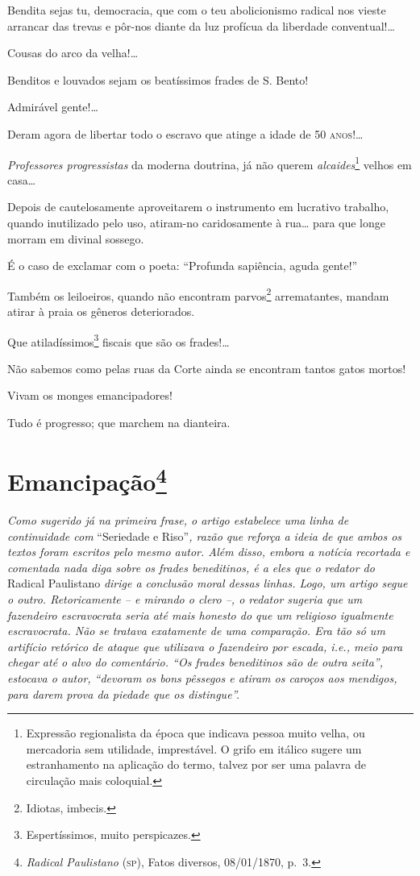 Bendita sejas tu, democracia, que com o teu abolicionismo radical nos
vieste arrancar das trevas e pôr-nos diante da luz profícua da liberdade
conventual!\ldots{}

Cousas do arco da velha!\ldots{}

Benditos e louvados sejam os beatíssimos frades de S. Bento!

Admirável gente!\ldots{}

Deram agora de libertar todo o escravo que atinge a idade de 50 \textsc{anos}!\ldots{}

\emph{Professores progressistas} da moderna doutrina, já não querem
\emph{alcaides}\footnote{ Expressão regionalista da época que indicava
  pessoa muito velha, ou mercadoria sem utilidade, imprestável. O grifo
  em itálico sugere um estranhamento na aplicação do termo, talvez por
  ser uma palavra de circulação mais coloquial.} velhos em casa\ldots{}

Depois de cautelosamente aproveitarem o instrumento em lucrativo
trabalho, quando inutilizado pelo uso, atiram-no caridosamente à rua\ldots{}
para que longe morram em divinal sossego.

É o caso de exclamar com o poeta: ``Profunda sapiência, aguda gente!''

Também os leiloeiros, quando não encontram parvos\footnote{ Idiotas,
  imbecis.} arrematantes, mandam atirar à praia os gêneros deteriorados.

Que atiladíssimos\footnote{ Espertíssimos, muito perspicazes.} fiscais
que são os frades!\ldots{}

Não sabemos como pelas ruas da Corte ainda se encontram tantos gatos
mortos!

Vivam os monges emancipadores!

Tudo é progresso; que marchem na dianteira.

\chapter{Emancipação\footnote{\emph{Radical Paulistano} (\textsc{sp}), Fatos diversos,
  08/01/1870, p.~3.}} %

\begin{didascalia}
\emph{Como sugerido já na primeira frase, o artigo estabelece uma linha
de continuidade com} ``Seriedade e Riso''\emph{, razão que reforça a ideia
de que ambos os textos foram escritos pelo mesmo autor. Além disso,
embora a notícia recortada e comentada nada diga sobre os frades
beneditinos, é a eles que o redator do} Radical Paulistano \emph{dirige
a conclusão moral dessas linhas. Logo, um artigo segue o outro.
Retoricamente -- e mirando o clero --, o redator sugeria que um
fazendeiro escravocrata seria até mais honesto do que um religioso
igualmente escravocrata. Não se tratava exatamente de uma comparação.
Era tão só um artifício retórico de ataque que utilizava o fazendeiro
por escada, i.e., meio para chegar até o alvo do comentário. ``Os frades
beneditinos são de outra seita'', estocava o autor, ``devoram os bons
pêssegos e atiram os caroços aos mendigos, para darem prova da piedade
que os distingue''.}
\end{didascalia}


